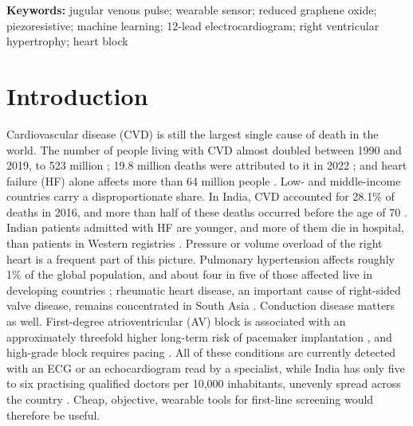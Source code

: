 \documentclass[11pt]{article}
\begin{document}
\noindent\textbf{Keywords:} jugular venous pulse; wearable sensor; reduced graphene oxide; piezoresistive; machine learning; 12-lead electrocardiogram; right ventricular hypertrophy; heart block
\section*{Introduction}

Cardiovascular disease (CVD) is still the largest single cause of death in the world. The number of people living with CVD almost doubled between 1990 and 2019, to 523 million \cite{roth2020global}; 19.8 million deaths were attributed to it in 2022 \cite{mensah2023global}; and heart failure (HF) alone affects more than 64 million people \cite{savarese2023global}. Low- and middle-income countries carry a disproportionate share. In India, CVD accounted for 28.1\% of deaths in 2016, and more than half of these deaths occurred before the age of 70 \cite{indiastatelevel2018changing,prabhakaran2016cardiovascular}. Indian patients admitted with HF are younger, and more of them die in hospital, than patients in Western registries \cite{harikrishnan2015clinical}. Pressure or volume overload of the right heart is a frequent part of this picture. Pulmonary hypertension affects roughly 1\% of the global population, and about four in five of those affected live in developing countries \cite{hoeper2016global,humbert2022esc}; rheumatic heart disease, an important cause of right-sided valve disease, remains concentrated in South Asia \cite{watkins2017global}. Conduction disease matters as well. First-degree atrioventricular (AV) block is associated with an approximately threefold higher long-term risk of pacemaker implantation \cite{cheng2009longterm,kerola2019risk}, and high-grade block requires pacing \cite{kusumoto2019acc,glikson2021esc}. All of these conditions are currently detected with an ECG or an echocardiogram read by a specialist, while India has only five to six practising qualified doctors per 10,000 inhabitants, unevenly spread across the country \cite{karan2021size}. Cheap, objective, wearable tools for first-line screening would therefore be useful.
\end{document}

